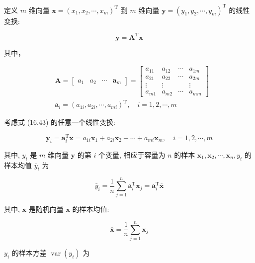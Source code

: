 \documentclass[10pt]{article}
\begin{document}
定义 $m$ 维向量 $\boldsymbol{x}=\left(x_{1}, x_{2}, \cdots, x_{m}\right)^{\mathrm{T}}$ 到 $m$ 维向量 $\boldsymbol{y}=\left(y_{1}, y_{2}, \cdots, y_{m}\right)^{\mathrm{T}}$ 的线性变换:


\begin{equation*}
\boldsymbol{y}=\boldsymbol{A}^{\mathrm{T}} \boldsymbol{x} \tag{16.43}
\end{equation*}


其中，

$$
\begin{aligned}
& \boldsymbol{A}=\left[\begin{array}{llll}
a_{1} & a_{2} & \cdots & \boldsymbol{a}_{m}
\end{array}\right]=\left[\begin{array}{cccc}
a_{11} & a_{12} & \cdots & a_{1 m} \\
a_{21} & a_{22} & \cdots & a_{2 m} \\
\vdots & \vdots & & \vdots \\
a_{m 1} & a_{m 2} & \cdots & a_{m m}
\end{array}\right] \\
& \boldsymbol{a}_{i}=\left(a_{1 i}, a_{2 i}, \cdots, a_{m i}\right)^{\mathrm{T}}, \quad i=1,2, \cdots, m
\end{aligned}
$$

考虑式 (16.43) 的任意一个线性变换:


\begin{equation*}
\boldsymbol{y}_{i}=\boldsymbol{a}_{i}^{\mathrm{T}} \boldsymbol{x}=a_{1 i} \boldsymbol{x}_{1}+a_{2 i} \boldsymbol{x}_{2}+\cdots+a_{m i} \boldsymbol{x}_{m}, \quad i=1,2, \cdots, m \tag{16.44}
\end{equation*}


其中, $y_{i}$ 是 $m$ 维向量 $\boldsymbol{y}$ 的第 $i$ 个变量, 相应于容量为 $n$ 的样本 $\boldsymbol{x}_{1}, \boldsymbol{x}_{2}, \cdots, \boldsymbol{x}_{n}, y_{i}$ 的样本均值 $\bar{y}_{i}$ 为


\begin{equation*}
\bar{y}_{i}=\frac{1}{n} \sum_{j=1}^{n} \boldsymbol{a}_{i}^{\mathrm{T}} \boldsymbol{x}_{j}=\boldsymbol{a}_{i}^{\mathrm{T}} \overline{\boldsymbol{x}} \tag{16.45}
\end{equation*}


其中, $\overline{\boldsymbol{x}}$ 是随机向量 $\boldsymbol{x}$ 的样本均值:

$$
\overline{\boldsymbol{x}}=\frac{1}{n} \sum_{j=1}^{n} \boldsymbol{x}_{j}
$$

$y_{i}$ 的样本方差 $\operatorname{var}\left(y_{i}\right)$ 为
\end{document}
